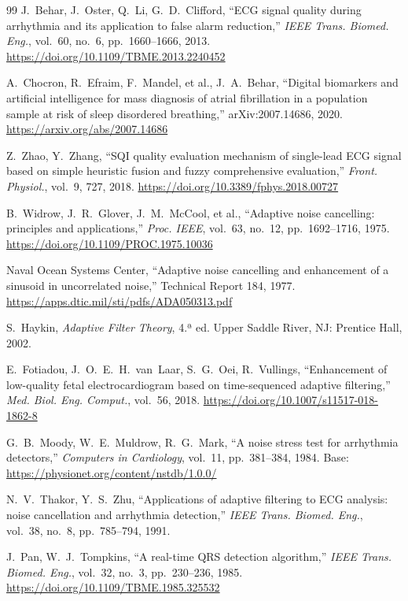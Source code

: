 \documentclass[11pt,a4paper]{article}
\begin{document}
\begin{thebibliography}{99}
 J.~Behar, J.~Oster, Q.~Li, G.~D.~Clifford, ``ECG signal quality during arrhythmia and its application to false alarm reduction,'' \textit{IEEE Trans. Biomed. Eng.}, vol.~60, no.~6, pp.~1660--1666, 2013. \url{https://doi.org/10.1109/TBME.2013.2240452}

 A.~Chocron, R.~Efraim, F.~Mandel, et al., J.~A.~Behar, ``Digital biomarkers and artificial intelligence for mass diagnosis of atrial fibrillation in a population sample at risk of sleep disordered breathing,'' arXiv:2007.14686, 2020. \url{https://arxiv.org/abs/2007.14686}

 Z.~Zhao, Y.~Zhang, ``SQI quality evaluation mechanism of single-lead ECG signal based on simple heuristic fusion and fuzzy comprehensive evaluation,'' \textit{Front. Physiol.}, vol.~9, 727, 2018. \url{https://doi.org/10.3389/fphys.2018.00727}

 B.~Widrow, J.~R.~Glover, J.~M.~McCool, et al., ``Adaptive noise cancelling: principles and applications,'' \textit{Proc. IEEE}, vol.~63, no.~12, pp.~1692--1716, 1975. \url{https://doi.org/10.1109/PROC.1975.10036}

 Naval Ocean Systems Center, ``Adaptive noise cancelling and enhancement of a sinusoid in uncorrelated noise,'' Technical Report 184, 1977. \url{https://apps.dtic.mil/sti/pdfs/ADA050313.pdf}

 S.~Haykin, \textit{Adaptive Filter Theory}, 4.ª ed. Upper Saddle River, NJ: Prentice Hall, 2002.

 E.~Fotiadou, J.~O.~E.~H.~van~Laar, S.~G.~Oei, R.~Vullings, ``Enhancement of low-quality fetal electrocardiogram based on time-sequenced adaptive filtering,'' \textit{Med. Biol. Eng. Comput.}, vol.~56, 2018. \url{https://doi.org/10.1007/s11517-018-1862-8}

 G.~B.~Moody, W.~E.~Muldrow, R.~G.~Mark, ``A noise stress test for arrhythmia detectors,'' \textit{Computers in Cardiology}, vol.~11, pp.~381--384, 1984. Base: \url{https://physionet.org/content/nstdb/1.0.0/}

 N.~V.~Thakor, Y.~S.~Zhu, ``Applications of adaptive filtering to ECG analysis: noise cancellation and arrhythmia detection,'' \textit{IEEE Trans. Biomed. Eng.}, vol.~38, no.~8, pp.~785--794, 1991.

 J.~Pan, W.~J.~Tompkins, ``A real-time QRS detection algorithm,'' \textit{IEEE Trans. Biomed. Eng.}, vol.~32, no.~3, pp.~230--236, 1985. \url{https://doi.org/10.1109/TBME.1985.325532}


\end{thebibliography}
\end{document}
